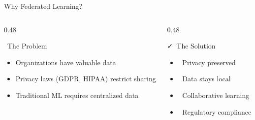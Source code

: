 \documentclass[aspectratio=169, 11pt]{beamer}
\begin{document}
\begin{frame}{Why Federated Learning?}
    \begin{columns}[T]
        \begin{column}{0.48\textwidth}
            \begin{block}{\faExclamationTriangle\ The Problem}
                \begin{itemize}
                    \item Organizations have valuable data
                    \item Privacy laws (GDPR, HIPAA) restrict sharing
                    \item Traditional ML requires centralized data
                \end{itemize}
            \end{block}
        \end{column}
        
        \begin{column}{0.48\textwidth}
            \begin{exampleblock}{\faCheck\ The Solution}
                \begin{itemize}
                    \item \faShieldAlt\ Privacy preserved
                    \item \faLock\ Data stays local
                    \item \faUsers\ Collaborative learning
                    \item \faBalanceScale\ Regulatory compliance
                \end{itemize}
            \end{exampleblock}
        \end{column}
    \end{columns}
\end{frame}
\end{document}
